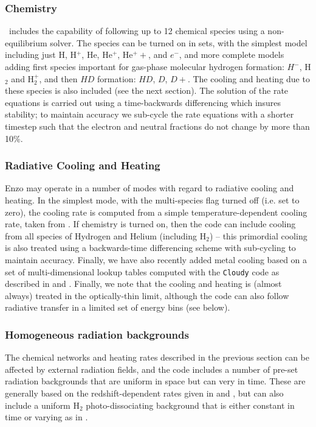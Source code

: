 \subsubsection{Chemistry}
\label{sec.ov.chem}

\enzo\ includes the capability of following up to
12 chemical species using a non-equilibrium solver.  The species can
be turned on in sets, with the simplest model including just H, H$^+$,
He, He$^+$, He$^++$, and $e^-$, and more complete models adding first
species important for gas-phase molecular hydrogen formation: $H^-$,
H$_2$ and H$_2^+$, and then $HD$ formation: $HD$, $D$, $D+$.  The
cooling and heating due to these species is also included (see the
next section).  The solution of the rate equations is carried out
using a time-backwards differencing which insures stability; to
maintain accuracy we sub-cycle the rate equations with a shorter
timestep such that the electron and neutral fractions do not change by
more than 10\%.

\subsubsection{Radiative Cooling and Heating}

Enzo may operate in a number of modes with regard to radiative cooling
and heating.  In the simplest mode, with the multi-species flag turned
off (i.e. set to zero), the cooling rate is computed from a simple
temperature-dependent cooling rate, taken from \citet{SW87}.  If
chemistry is turned on, then the code can include cooling from all
species of Hydrogen and Helium (including H$_2$) -- this primordial cooling is
also treated using a backwards-time differencing scheme with
sub-cycling to maintain accuracy.  Finally, we have also recently
added metal cooling based on a set of multi-dimensional lookup tables
computed with the \texttt{Cloudy} code \citep{1998PASP..110..761F} as
described in \citet{2008MNRAS.385.1443S} and
\citet{2011ApJ...731....6S}.  Finally, we note that the cooling and
heating is (almost always) treated in the optically-thin limit,
although the code can also follow radiative transfer in a limited set
of energy bins (see below).

\subsubsection{Homogeneous radiation backgrounds}

The chemical networks and heating rates described in the previous
section can be affected by external radiation fields, and the code
includes a number of pre-set radiation backgrounds that are uniform in
space but can very in time.  These are generally based on the
redshift-dependent rates given in \citet{1996ApJ...461...20H} and
\citet{2012ApJ...746..125H}, but can also include a uniform H$_2$
photo-dissociating background that is either constant in time or
varying as in \citet{WiseAbel05}.

